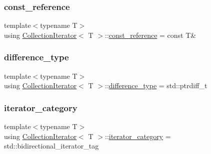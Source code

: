\mbox{\label{class_collection_iterator_ab0f0742da5375882a74038d82de41aca}} 
\subsubsection{\texorpdfstring{const\+\_\+reference}{const\_reference}}
{\footnotesize\ttfamily template$<$typename T$>$ \\
using \hyperlink{class_collection_iterator}{Collection\+Iterator}$<$ T $>$\+::\hyperlink{class_collection_iterator_ab0f0742da5375882a74038d82de41aca}{const\+\_\+reference} =  const T\&}

\mbox{\label{class_collection_iterator_a4dca8639d1f342073ccf8bcd4d27e3bf}} 
\subsubsection{\texorpdfstring{difference\+\_\+type}{difference\_type}}
{\footnotesize\ttfamily template$<$typename T$>$ \\
using \hyperlink{class_collection_iterator}{Collection\+Iterator}$<$ T $>$\+::\hyperlink{class_collection_iterator_a4dca8639d1f342073ccf8bcd4d27e3bf}{difference\+\_\+type} =  std\+::ptrdiff\+\_\+t}

\mbox{\label{class_collection_iterator_a0f4af23418960a0fe3889b5381d6a79c}} 
\subsubsection{\texorpdfstring{iterator\+\_\+category}{iterator\_category}}
{\footnotesize\ttfamily template$<$typename T$>$ \\
using \hyperlink{class_collection_iterator}{Collection\+Iterator}$<$ T $>$\+::\hyperlink{class_collection_iterator_a0f4af23418960a0fe3889b5381d6a79c}{iterator\+\_\+category} =  std\+::bidirectional\+\_\+iterator\+\_\+tag}


